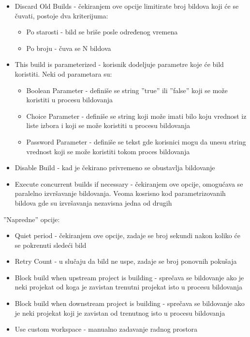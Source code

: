 \begin{itemize}  
\item Discard Old Builds - čekiranjem ove opcije limitirate broj bildova koji će se čuvati, postoje dva kriterijuma:
\begin{itemize}
\item Po starosti - bild se briše posle određenog vremena
\item Po broju - čuva se N bildova
\end{itemize}
\item This build is parameterized - korisnik dodeljuje parametre koje će bild koristiti. Neki od parametara su:
\begin{itemize}
\item Boolean Parameter - definiše se string ''true'' ili ''false'' koji se može koristiti u procesu bildovanja
\item Choice Parameter - definiše se string koji može imati bilo koju vrednost iz liste izbora i koji se može koristiti u procesu bildovanja
\item Password Parameter - definiše se tekst gde korisnici mogu da unesu string vrednost koji se može koristiti tokom proces bildovanja
\end{itemize}
\item Disable Build - kad je čekirano privremeno se obustavlja bildovanje
\item Execute concurrent builds if necessary - čekiranjem ove opcije, omogućava se paralelno izvršavanje bildovanja. Veoma kosrisno kod parametrizovanih bildova gde su izvršavanja nezavisna jedna od drugih
\end{itemize}

''Napredne'' opcije:
\begin{itemize}  
\item Quiet period - čekiranjem ove opcije, zadaje se broj sekundi nakon koliko će se pokrenuti sledeći bild
\item Retry Count - u slučaju da bild ne uspe, zadaje se broj ponovnih pokušaja
\item Block build when upstream project is building - sprečava se bildovanje ako je neki projekat od koga je zavistan trenutni projekat isto u procesu bildovanja
\item Block build when downstream project is building - sprečava se bildovanje ako je neki projekat koji je zavistan od trenutnog isto u procesu bildovanja
\item Use custom workspace - manualno zadavanje radnog prostora
\end{itemize}

